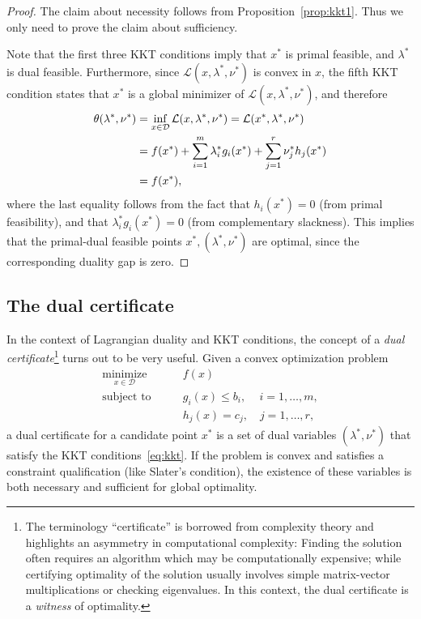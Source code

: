 \begin{proof}
The claim about necessity follows from Proposition~\ref{prop:kkt1}. Thus we only need to prove the claim about sufficiency.

Note that the first three KKT
conditions imply that $x^*$ is primal feasible, and $\lambda^*$ is dual feasible.
Furthermore, since ${\mathcal L}(x,\lambda^*,\nu^*)$  is convex in $x$, the fifth KKT condition states
that $x^*$ is a global minimizer of
${\mathcal L}(x,\lambda^*,\nu^*)$, and therefore
\begin{align*}
 \theta(\lambda^*,\nu^*) & = \inf_{x\in {\mathcal D}}  {\mathcal L}(x,\lambda^*,\nu^*)  = {\mathcal L}(x^*,\lambda^*,\nu^*) \\
 & = f(x^*) + \sum_{i=1}^m \lambda^{*}_i g_i(x^*)
+ \sum_{j=1}^r \nu^{*}_j h_j(x^*) \\
& = f(x^*),
\end{align*}
where the last equality follows from the fact that $h_i(x^*) = 0$ (from primal feasibility), and that $\lambda^{*}_i g_i(x^*)=0$ (from complementary slackness).
This implies that the primal-dual feasible points $x^*,(\lambda^*,\nu^*)$
are optimal, since the corresponding duality gap is zero.

\end{proof}


 


\subsection{The dual certificate}\label{ss:dualcertificate}

In the context of Lagrangian duality and KKT conditions, the 
concept of a {\em dual certificate}\footnote{The terminology ``certificate'' is borrowed from complexity theory and highlights an asymmetry in computational complexity: Finding the solution often requires an algorithm which may be computationally expensive; while certifying optimality of the solution usually involves simple matrix-vector multiplications or checking eigenvalues. In this context, the dual certificate is a {\em witness} of optimality.} turns out to be very useful.
Given a convex optimization problem
\begin{align*}
\underset{x \in \mathcal{D}}{\operatorname{minimize}} & \qquad   f(x)  \\
 \text{subject to} & \qquad g_i(x) \le b_i, \quad \, i = 1, \dots, m, \\
 & \qquad h_j(x) = c_j, \quad j=1,\dots,r,
\end{align*}
a dual certificate for a candidate point $x^*$ is a set of dual variables $(\lambda^*, \nu^*)$ that satisfy the KKT conditions~\eqref{eq:kkt}. If the problem is convex and satisfies a constraint qualification (like Slater's condition), the existence of these variables is both necessary and sufficient for global optimality.

